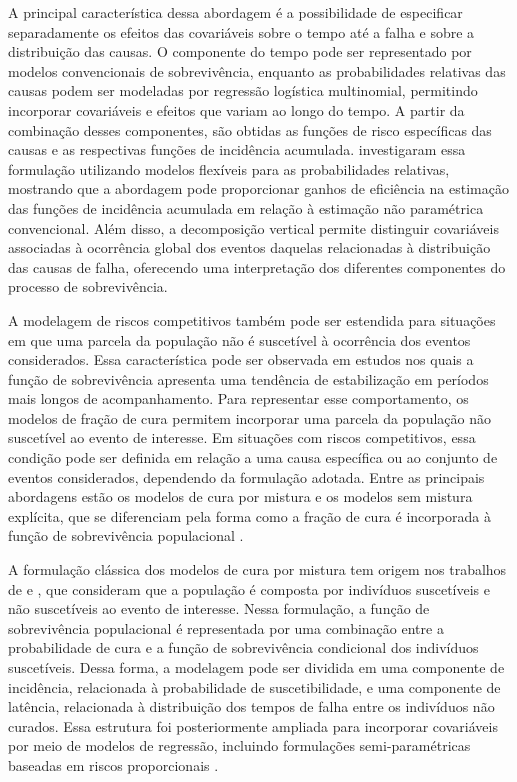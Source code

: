 \documentclass[11pt,a4paper]{article}
\begin{document}
A principal característica dessa abordagem é a possibilidade de especificar separadamente os efeitos das covariáveis sobre o tempo até a falha e sobre a distribuição das causas. O componente do tempo pode ser representado por modelos convencionais de sobrevivência, enquanto as probabilidades relativas das causas podem ser modeladas por regressão logística multinomial, permitindo incorporar covariáveis e efeitos que variam ao longo do tempo. A partir da combinação desses componentes, são obtidas as funções de risco específicas das causas e as respectivas funções de incidência acumulada. \citet{nicolaie2010vertical} investigaram essa formulação utilizando modelos flexíveis para as probabilidades relativas, mostrando que a abordagem pode proporcionar ganhos de eficiência na estimação das funções de incidência acumulada em relação à estimação não paramétrica convencional. Além disso, a decomposição vertical permite distinguir covariáveis associadas à ocorrência global dos eventos daquelas relacionadas à distribuição das causas de falha, oferecendo uma interpretação dos diferentes componentes do processo de sobrevivência.

A modelagem de riscos competitivos também pode ser estendida para situações em que uma parcela da população não é suscetível à ocorrência dos eventos considerados. Essa característica pode ser observada em estudos nos quais a função de sobrevivência apresenta uma tendência de estabilização em períodos mais longos de acompanhamento. Para representar esse comportamento, os modelos de fração de cura permitem incorporar uma parcela da população não suscetível ao evento de interesse. Em situações com riscos competitivos, essa condição pode ser definida em relação a uma causa específica ou ao conjunto de eventos considerados, dependendo da formulação adotada. Entre as principais abordagens estão os modelos de cura por mistura e os modelos sem mistura explícita, que se diferenciam pela forma como a fração de cura é incorporada à função de sobrevivência populacional \citep{amico2018cure}.

A formulação clássica dos modelos de cura por mistura tem origem nos trabalhos de \cite{boag1949maximum} e \cite{berkson1952survival}, que consideram que a população é composta por indivíduos suscetíveis e não suscetíveis ao evento de interesse. Nessa formulação, a função de sobrevivência populacional é representada por uma combinação entre a probabilidade de cura e a função de sobrevivência condicional dos indivíduos suscetíveis. Dessa forma, a modelagem pode ser dividida em uma componente de incidência, relacionada à probabilidade de suscetibilidade, e uma componente de latência, relacionada à distribuição dos tempos de falha entre os indivíduos não curados. Essa estrutura foi posteriormente ampliada para incorporar covariáveis por meio de modelos de regressão, incluindo formulações semi-paramétricas baseadas em riscos proporcionais \citep{sy2000estimation}.
\end{document}
